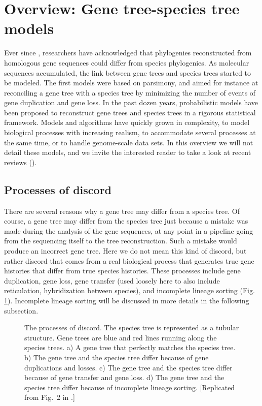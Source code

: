 \section{Overview: Gene tree-species tree models}

Ever since \cite{Zuckerkandl1965a}, researchers have acknowledged that phylogenies reconstructed from homologous gene sequences could differ from species phylogenies.
As molecular sequences accumulated, the link between gene trees and species trees started to be modeled. 
The first models were based on parsimony, and aimed for instance at reconciling a gene tree with a species tree by minimizing the number of events of gene duplication and gene loss. 
In the past dozen years, probabilistic models have been proposed to reconstruct gene trees and species trees in a rigorous statistical framework.
Models and algorithms have quickly grown in complexity, to model biological processes with increasing realism, to accommodate several processes at the same time, or to handle genome-scale data sets.
In this overview we will not detail these models, and we invite the interested reader to take a look at recent reviews (\EG \citep{Szollosi28072014}).

\subsection{Processes of discord}
There are several reasons why a gene tree may differ from a species tree. 
Of course, a gene tree may differ from the species tree just because a mistake was made during the analysis of the gene sequences, at any point in a pipeline going from the sequencing itself to the tree reconstruction.
Such a mistake would produce an incorrect gene tree.
Here we do not mean this kind of discord, but rather discord that comes from a real biological process that generates true gene histories that differ from true species histories.
These processes include gene duplication, gene loss, gene transfer (used loosely here to also include reticulation, hybridization between species), and incomplete lineage sorting (Fig. \ref{fig1}). 
Incomplete lineage sorting will be discussed in more details in the following subsection.

\begin{figure}[h!]
\centering
{}
\caption{\small The processes of discord. The species tree is represented as a tubular structure. Gene trees are blue and red lines running along the species trees. a) A gene tree that perfectly matches the species tree. b) The gene tree and the species tree differ because of gene duplications and losses. c)  The gene tree and the species tree differ because of gene transfer and gene loss. d)  The gene tree and the species tree differ because of incomplete lineage sorting.   [Replicated from Fig.~2 in \citet{Boussau2009}.]}
\label{fig1}
\end{figure}

